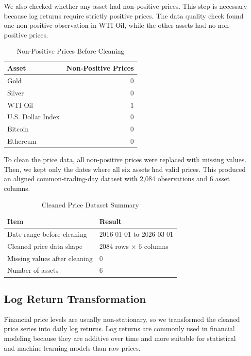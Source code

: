 \documentclass[12pt]{article}
\begin{document}
We also checked whether any asset had non-positive prices. This step is necessary because log returns require strictly positive prices. The data quality check found one non-positive observation in WTI Oil, while the other assets had no non-positive prices.

\begin{table}[H]
\centering
\caption{Non-Positive Prices Before Cleaning}
\begin{tabular}{lr}
\toprule
\textbf{Asset} & \textbf{Non-Positive Prices} \\
\midrule
Gold & 0 \\
Silver & 0 \\
WTI Oil & 1 \\
U.S. Dollar Index & 0 \\
Bitcoin & 0 \\
Ethereum & 0 \\
\bottomrule
\end{tabular}
\end{table}

To clean the price data, all non-positive prices were replaced with missing values. Then, we kept only the dates where all six assets had valid prices. This produced an aligned common-trading-day dataset with 2,084 observations and 6 asset columns.

\begin{table}[H]
\centering
\caption{Cleaned Price Dataset Summary}
\begin{tabular}{ll}
\toprule
\textbf{Item} & \textbf{Result} \\
\midrule
Date range before cleaning & 2016-01-01 to 2026-03-01 \\
Cleaned price data shape & 2084 rows $\times$ 6 columns \\
Missing values after cleaning & 0 \\
Number of assets & 6 \\
\bottomrule
\end{tabular}
\end{table}

\subsection{Log Return Transformation}

Financial price levels are usually non-stationary, so we transformed the cleaned price series into daily log returns. Log returns are commonly used in financial modeling because they are additive over time and more suitable for statistical and machine learning models than raw prices.
\end{document}
